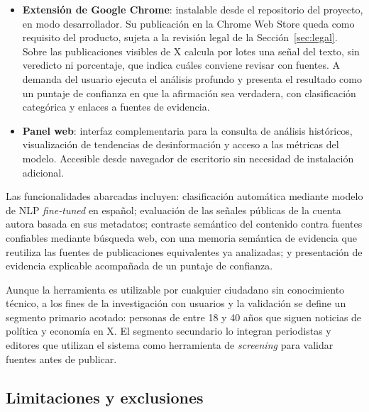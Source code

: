 \begin{itemize}
    \item \textbf{Extensión de Google Chrome}: instalable desde el repositorio del proyecto, en modo desarrollador. Su publicación en la Chrome Web Store queda como requisito del producto, sujeta a la revisión legal de la Sección~\ref{sec:legal}. Sobre las publicaciones visibles de X calcula por lotes una señal del texto, sin veredicto ni porcentaje, que indica cuáles conviene revisar con fuentes. A demanda del usuario ejecuta el análisis profundo y presenta el resultado como un puntaje de confianza en que la afirmación sea verdadera, con clasificación categórica y enlaces a fuentes de evidencia.
    \item \textbf{Panel web}: interfaz complementaria para la consulta de análisis históricos, visualización de tendencias de desinformación y acceso a las métricas del modelo. Accesible desde navegador de escritorio sin necesidad de instalación adicional.
\end{itemize}

Las funcionalidades abarcadas incluyen: clasificación automática mediante modelo de NLP \textit{fine-tuned} en español; evaluación de las señales públicas de la cuenta autora basada en sus metadatos; contraste semántico del contenido contra fuentes confiables mediante búsqueda web, con una memoria semántica de evidencia que reutiliza las fuentes de publicaciones equivalentes ya analizadas; y presentación de evidencia explicable acompañada de un puntaje de confianza.

Aunque la herramienta es utilizable por cualquier ciudadano sin conocimiento técnico, a los fines de la investigación con usuarios y la validación se define un segmento primario acotado: personas de entre 18 y 40 años que siguen noticias de política y economía en X. El segmento secundario lo integran periodistas y editores que utilizan el sistema como herramienta de \textit{screening} para validar fuentes antes de publicar.

\subsection{Limitaciones y exclusiones}

